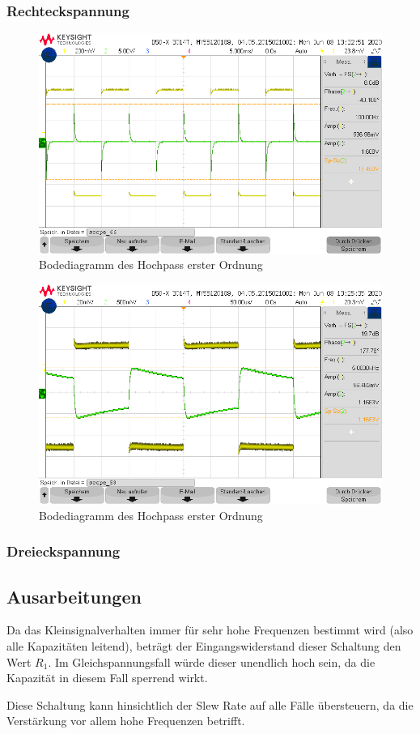 \subsubsection{Rechteckspannung}
\begin{figure}[H]
    \centering
    \includegraphics[width=\costumPicWidth]{Lab_2/Messungen/HP_first_order/scope_66.png}
    \caption{Bodediagramm des Hochpass erster Ordnung}
    \label{fig:Bode_HP_first_order}
\end{figure}
\begin{figure}[H]
    \centering
    \includegraphics[width=\costumPicWidth]{Lab_2/Messungen/HP_first_order/scope_53.png}
    \caption{Bodediagramm des Hochpass erster Ordnung}
    \label{fig:Bode_HP_first_order}
\end{figure}

\subsubsection{Dreieckspannung}


\subsection{Ausarbeitungen}
Da das Kleinsignalverhalten immer für sehr hohe Frequenzen bestimmt wird (also alle Kapazitäten leitend), beträgt der Eingangswiderstand dieser Schaltung den Wert $R_1$. Im Gleichspannungsfall würde dieser unendlich hoch sein, da die Kapazität in diesem Fall sperrend wirkt.

Diese Schaltung kann hinsichtlich der Slew Rate auf alle Fälle übersteuern, da die Verstärkung vor allem hohe Frequenzen betrifft.